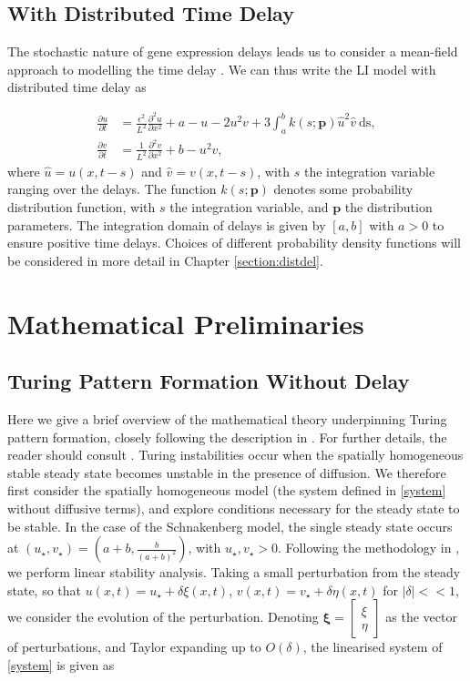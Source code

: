 \subsection{With Distributed Time Delay}

The stochastic nature of gene expression delays leads us to consider a mean-field approach to modelling the time delay \cite{bratsun,krausenew}. We can thus write the LI model with distributed time delay as

\begin{equation}\label{distmodel}
  \begin{split}
    \frac{\partial u}{\partial t}&=\frac{\epsilon^2}{L^2}\frac{\partial^2u}{\partial x^2}+a-u-2u^2v+3\int_{a}^{b}k(s;\textbf{p})\hat{u}^2\hat{v} \ \text{ds},\\
    \frac{\partial v}{\partial t}&=\frac{1}{L^2}\frac{\partial^2v}{\partial x^2}+b-u^2v,
\end{split}
\end{equation}
where $\hat{u}=u(x,t-s)$ and $\hat{v}=v(x,t-s)$, with $s$ the integration variable ranging over the delays. The function $k(s;\textbf{p})$ denotes some probability distribution function, with $s$ the integration variable, and $\textbf{p}$ the distribution parameters. The integration domain of delays is given by $[a,b]$ with $a>0$ to ensure positive time delays. Choices of different probability density functions will be considered in more detail in Chapter \ref{section:distdel}.

\section{Mathematical Preliminaries}
\subsection{Turing Pattern Formation Without Delay}
Here we give a brief overview of the mathematical theory underpinning Turing pattern formation, closely following the description in \cite{murray}. For further details, the reader should consult \cite{murray,beentjes}. Turing instabilities occur when the spatially homogeneous stable steady state becomes unstable in the presence of diffusion. We therefore first consider the spatially homogeneous model (the system defined in \eqref{system} without diffusive terms), and explore conditions necessary for the steady state to be stable. In the case of the Schnakenberg model, the single steady state occurs at $(u_\star, v_\star)=\left(a+b, \frac{b}{(a+b)^2}\right)$, with $u_\star,v_\star>0$. Following the methodology in \cite{murray}, we perform linear stability analysis. Taking a small perturbation from the steady state, so that $u(x,t)=u_\star+\delta\xi(x,t) $, $v(x,t)=v_\star+\delta\eta(x,t) $ for $|\delta|<<1$, we consider the evolution of the perturbation. Denoting $\pmb{\xi}=\begin{bmatrix}\xi \\ \eta\end{bmatrix}$ as the vector of perturbations, and Taylor expanding up to $O(\delta)$, the linearised system of \eqref{system} is given as

